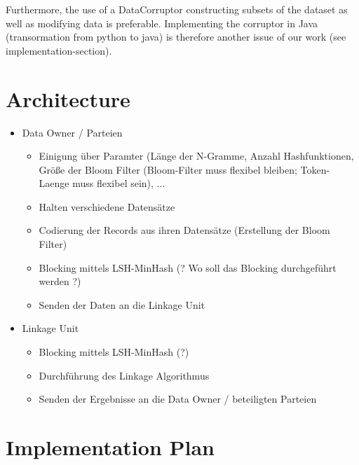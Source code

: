\documentclass[10pt]{article}
\begin{document}
            Furthermore, the use of a DataCorruptor constructing subsets of the dataset as well as
            modifying data is preferable. Implementing the corruptor in Java (transormation from python to java)
            is therefore another issue of our work (see implementation-section).


    \section{Architecture}


        \begin{itemize}
			\item Data Owner / Parteien
				\begin{itemize}
					\item Einigung über Paramter (Länge der N-Gramme, Anzahl Hashfunktionen,
					Größe der Bloom Filter (Bloom-Filter muss flexibel bleiben; Token-Laenge muss flexibel sein), ...
					\item Halten verschiedene Datensätze
					\item Codierung der Records aus ihren Datensätze (Erstellung der Bloom Filter)
					\item Blocking mittels LSH-MinHash 
					(? Wo soll das Blocking durchgeführt werden ?)
					\item Senden der Daten an die Linkage Unit
				\end{itemize}
			\item Linkage Unit
				\begin{itemize}
					\item Blocking mittels LSH-MinHash (?)
					\item Durchführung des Linkage Algorithmus
					\item Senden der Ergebnisse an die Data Owner / beteiligten Parteien
				\end{itemize}	
		\end{itemize} 

    \section{Implementation Plan}

\end{document}
